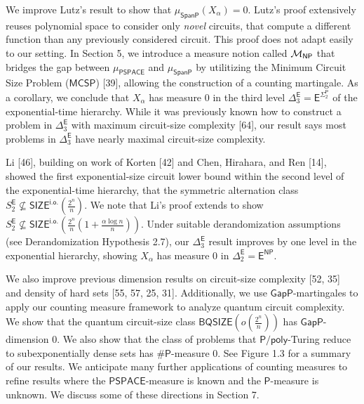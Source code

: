 We improve Lutz’s result to show that $\mu_{\mathsf{SpanP}}(X_{\alpha})=0$. Lutz’s proof extensively reuses polynomial space to consider only \emph{novel} circuits, that compute a different function than any previously considered circuit. This proof does not adapt easily to our setting. In Section 5, we introduce a measure notion called ${{\cal M}_{\mathsf{NP}}}$ that bridges the gap between
$\mu_{\mathsf{PSPACE}}$ and $\mu_{\mathsf{SpanP}}$ by utilitizing the Minimum Circuit Size Problem ($\mathsf{MCSP}$) [39], allowing the construction of a counting martingale.
As a corollary, we conclude that
$X_{\alpha}$ has measure 0 in the third level
$\Delta^{\mathsf{E}}_{3}=\mathsf{E}^{\Sigma^{\mathsf{P}}_{2}}$ of the exponential-time hierarchy. While it was previously known how to construct a problem in $\Delta^{\mathsf{E}}_{3}$ with maximum circuit-size complexity [64], our result says most problems in $\Delta^{\mathsf{E}}_{3}$ have nearly maximal circuit-size complexity.\par




Li [46], building on work of Korten [42] and Chen, Hirahara, and Ren [14], showed the first exponential-size circuit lower bound within the second level of the exponential-time hierarchy, that the symmetric alternation class $S^{\mathsf{E}}_{2}\not\subseteq\mathsf{SIZE}^{\mathsf{i.o.}}\!\!(\frac{2^{n}}{n}).$ We note that Li’s proof extends to show
$S^{\mathsf{E}}_{2}\not\subseteq\mathsf{SIZE}^{\mathsf{i.o.}}\!\!\left(\frac{2^{n}}{n}\!\left(1+\frac{\alpha\log n}{n}\right)\right)$.
Under suitable derandomization assumptions (see Derandomization Hypothesis 2.7), our $\Delta^{\mathsf{E}}_{3}$ result improves by one level in the exponential hierarchy, showing $X_{\alpha}$ has measure 0 in
$\Delta^{\mathsf{E}}_{2}=\mathsf{E}^{\mathsf{NP}}$.\par




We also improve previous dimension results on circuit-size complexity [52, 35] and density of hard sets [55, 57, 25, 31].
Additionally, we use $\mathsf{GapP}$-martingales to apply our counting measure framework to analyze quantum circuit complexity. We show that the quantum circuit-size class $\mathsf{BQSIZE}\left(o\left(\frac{2^{n}}{n}\right)\right)$ has $\mathsf{GapP}$-dimension 0.
We also show that the class of
problems that ${\mathsf{P}/\mathsf{poly}}$-Turing
reduce to subexponentially dense sets has
${\mathsf{\#}\mathsf{P}}$-measure 0.
See Figure 1.3 for a summary of our results.
We anticipate many further applications of counting measures to refine results where the $\mathsf{PSPACE}$-measure is known and the $\mathsf{P}$-measure is unknown. We discuss some of these directions in Section 7.\par







